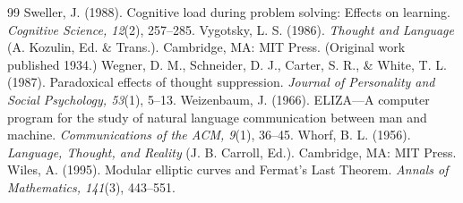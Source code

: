\documentclass[11pt]{article}
\begin{document}
\begin{thebibliography}{99}
 Sweller, J. (1988). Cognitive load during problem solving: Effects on learning. \emph{Cognitive Science, 12}(2), 257--285.
 Vygotsky, L. S. (1986). \emph{Thought and Language} (A. Kozulin, Ed. \& Trans.). Cambridge, MA: MIT Press. (Original work published 1934.)
 Wegner, D. M., Schneider, D. J., Carter, S. R., \& White, T. L. (1987). Paradoxical effects of thought suppression. \emph{Journal of Personality and Social Psychology, 53}(1), 5--13.
 Weizenbaum, J. (1966). ELIZA---A computer program for the study of natural language communication between man and machine. \emph{Communications of the ACM, 9}(1), 36--45.
 Whorf, B. L. (1956). \emph{Language, Thought, and Reality} (J. B. Carroll, Ed.). Cambridge, MA: MIT Press.
 Wiles, A. (1995). Modular elliptic curves and Fermat's Last Theorem. \emph{Annals of Mathematics, 141}(3), 443--551.
\end{thebibliography}
\end{document}
